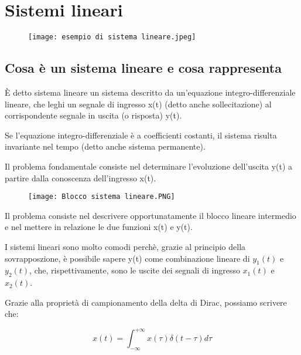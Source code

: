 \chapter{Sistemi lineari} 

\begin{figure}[h]
    \centering
    \texttt{[image: esempio di sistema lineare.jpeg]}
\end{figure}  

\newpage 

\section{Cosa è un sistema lineare e cosa rappresenta} 

È detto sistema lineare un sistema descritto da un'equazione integro-differenziale 
lineare, che leghi un segnale di ingresso x(t) (detto anche sollecitazione) 
al corrispondente segnale in uscita (o risposta) y(t). \newline 

Se l'equazione integro-differenziale è a coefficienti costanti, 
il sistema risulta invariante nel tempo (detto anche sistema permanente). \newline 

Il problema fondamentale consiste nel determinare l'evoluzione dell'uscita y(t) a partire dalla conoscenza 
dell'ingresso x(t). \newline 

{
    \begin{figure}[h]
        \centering
        \texttt{[image: Blocco sistema lineare.PNG]}
    \end{figure}  
     
}

Il problema consiste nel descrivere opportunatamente il blocco lineare intermedio e nel mettere in relazione 
le due funzioni x(t) e y(t). \newline 

I sistemi lineari sono molto comodi perchè, grazie al principio della sovrapposzione, 
è possibile sapere y(t) come combinazione lineare di $y_1(t)$ e $y_2(t)$, che, rispettivamente, 
sono le uscite dei segnali di ingresso $x_1(t)$ e $x_2(t)$. \newline 

Grazie alla proprietà di campionamento della delta di Dirac, possiamo scrivere che: 

{
    \Large 
    \begin{equation}
        x (t) 
        = 
        \int_{- \infty}^{+ \infty} 
        x (\tau) \delta(t - \tau) d\tau
    \end{equation}
}

